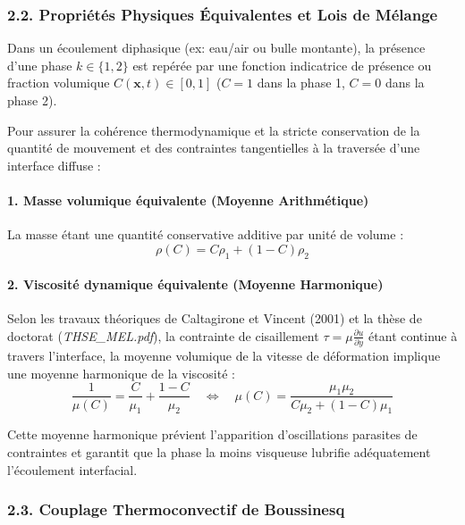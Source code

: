 \documentclass[
  french,
]{article}
\begin{document}
\subsubsection{2.2. Propriétés Physiques Équivalentes et Lois de
Mélange}\label{propriuxe9tuxe9s-physiques-uxe9quivalentes-et-lois-de-muxe9lange}

Dans un écoulement diphasique (ex: eau/air ou bulle montante), la
présence d'une phase \(k \in \{1, 2\}\) est repérée par une fonction
indicatrice de présence ou fraction volumique
\(C(\mathbf{x}, t) \in [0, 1]\) (\(C=1\) dans la phase 1, \(C=0\) dans
la phase 2).

Pour assurer la cohérence thermodynamique et la stricte conservation de
la quantité de mouvement et des contraintes tangentielles à la traversée
d'une interface diffuse :

\paragraph{1. Masse volumique équivalente (Moyenne
Arithmétique)}\label{masse-volumique-uxe9quivalente-moyenne-arithmuxe9tique}

La masse étant une quantité conservative additive par unité de volume :
\[\rho(C) = C \rho_1 + (1 - C) \rho_2\]

\paragraph{2. Viscosité dynamique équivalente (Moyenne
Harmonique)}\label{viscosituxe9-dynamique-uxe9quivalente-moyenne-harmonique}

Selon les travaux théoriques de Caltagirone et Vincent (2001) et la
thèse de doctorat (\emph{THSE\_MEL.pdf}), la contrainte de cisaillement
\(\tau = \mu \frac{\partial u}{\partial y}\) étant continue à travers
l'interface, la moyenne volumique de la vitesse de déformation implique
une moyenne harmonique de la viscosité :
\[\frac{1}{\mu(C)} = \frac{C}{\mu_1} + \frac{1 - C}{\mu_2} \quad \Longleftrightarrow \quad \mu(C) = \frac{\mu_1 \mu_2}{C \mu_2 + (1 - C) \mu_1}\]

Cette moyenne harmonique prévient l'apparition d'oscillations parasites
de contraintes et garantit que la phase la moins visqueuse lubrifie
adéquatement l'écoulement interfacial.

\subsubsection{2.3. Couplage Thermoconvectif de
Boussinesq}\label{couplage-thermoconvectif-de-boussinesq}
\end{document}
